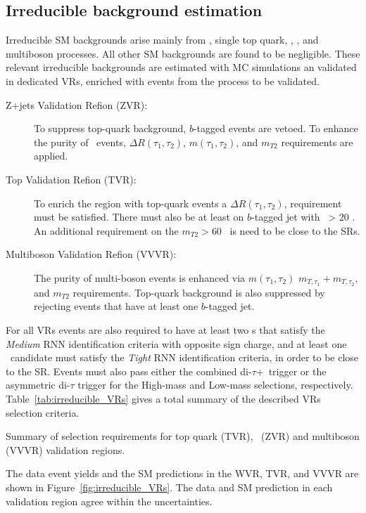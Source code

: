 	\subsection*{Irreducible background estimation}
	Irreducible \ac{SM} backgrounds arise mainly from \ttbar, single top quark, \ttV, \Zjets, and multiboson processes. All other \ac{SM} backgrounds are found to be negligible.  These relevant irreducible backgrounds are estimated with \ac{MC} simulations an validated in dedicated \acp{VR}, enriched with events from the process to be validated. 
	\begin{description}
	\item[Z+jets  Validation Refion (ZVR):] To suppress top-quark background, $b$-tagged events are vetoed. To enhance the purity of  \Zjets\ events, $\Delta R(\tau_1,\tau_2)$, $m(\tau_1,\tau_2)$, and $m_{T2}$ requirements are applied. 
	\item[Top Validation Refion (TVR):] To enrich the region with top-quark events a $\Delta R(\tau_1,\tau_2)$, requirement must be satisfied. There must also be at least on $b$-tagged jet with \pt\ > 20 \gev. An additional requirement on the $m_{T2} > 60$ \gev\ is need to be close to the \acp{SR}.
	\item[Multiboson  Validation Refion (VVVR):] The purity of multi-boson events is enhanced via $m(\tau_1,\tau_2)$ $m_{T,\tau_1}+m_{T,\tau_2}$, and $m_{T2}$ requirements. Top-quark background is also suppressed by rejecting events that have at least one $b$-tagged jet.
	\end{description}
	For all \acp{VR} events are also required to have at least two \ltau s that satisfy the \textit{Medium} \ac{RNN} identification criteria with opposite sign charge, and at least one \ltau\ candidate must satisfy the \textit{Tight} \ac{RNN} identification criteria, in order to be close to the \ac{SR}. 
	Events must also pass either the combined di-$\tau$+\met\ trigger or the asymmetric di-$\tau$ trigger for the High-mass and Low-mass selections, respectively.
	Table~\ref{tab:irreducible_VRs} gives a total summary of the described \acp{VR} selection criteria.
	\begin{table}[!hbt]
	\centering
	\caption{Summary of selection requirements for top quark (TVR), \Zjets\ (ZVR) and multiboson (VVVR) validation regions.}
	\resizebox{\textwidth}{!}{
		
	\quad
		
	}
	\label{tab:irreducible_VRs}
	\end{table}
	The data event yields and the SM predictions in the WVR,  TVR, and VVVR are shown in Figure~\ref{fig:irreducible_VRs}. The data and \ac{SM} prediction in each validation region agree within the uncertainties. 

